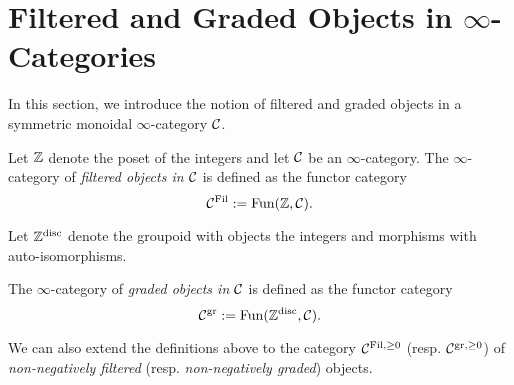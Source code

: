 %	
%

\section{Filtered and Graded Objects in $\infty$-Categories}
In this section, we introduce the notion of filtered and graded objects in a symmetric monoidal $\infty$-category ${\mathcal{C}}$.

\begin{definition}
	Let ${\mathbb{Z}}$ denote the poset of the integers and let ${\mathcal{C}}$ be an $\infty$-category.
	The $\infty$-category of \emph{filtered objects in ${\mathcal{C}}$} is defined as the functor category 
	$$
	{\mathcal{C}}^{\operatorname{Fil}}:=\operatorname{Fun}({\mathbb{Z}}, {\mathcal{C}}).
	$$
\end{definition}

Let ${\mathbb{Z}}^{\operatorname{disc}}$ denote the groupoid with objects the integers and morphisms with auto-isomorphisms.
\begin{definition}
	The $\infty$-category of \emph{graded objects in ${\mathcal{C}}$} is defined as the functor category 
	$$
	{\mathcal{C}}^{\operatorname{gr}}:=\operatorname{Fun}({\mathbb{Z}}^{\operatorname{disc}}, {\mathcal{C}}).
	$$
\end{definition}

\begin{remark}
	We can also extend the definitions above to the category ${\mathcal{C}}^{\operatorname{Fil}, \geq 0}$ (resp. ${\mathcal{C}}^{\operatorname{gr}, \geq 0}$) of \emph{non-negatively filtered} (resp. \emph{non-negatively graded}) objects.
\end{remark}

